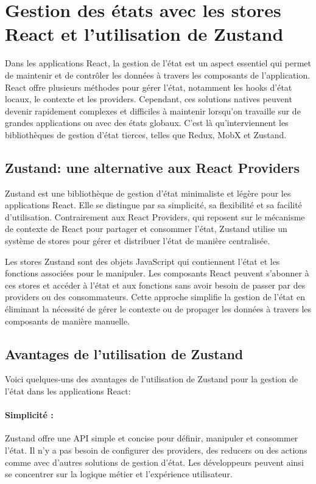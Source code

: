 \section{Gestion des états avec les stores React et l'utilisation de Zustand}

Dans les applications React, la gestion de l'état est un aspect essentiel qui permet de maintenir et de contrôler les données à travers les composants de l'application. React offre plusieurs méthodes pour gérer l'état, notamment les hooks d'état locaux, le contexte et les providers. Cependant, ces solutions natives peuvent devenir rapidement complexes et difficiles à maintenir lorsqu'on travaille sur de grandes applications ou avec des états globaux. C'est là qu'interviennent les bibliothèques de gestion d'état tierces, telles que Redux, MobX et Zustand.

\subsection{Zustand: une alternative aux React Providers}

Zustand est une bibliothèque de gestion d'état minimaliste et légère pour les applications React. Elle se distingue par sa simplicité, sa flexibilité et sa facilité d'utilisation. Contrairement aux React Providers, qui reposent sur le mécanisme de contexte de React pour partager et consommer l'état, Zustand utilise un système de stores pour gérer et distribuer l'état de manière centralisée.

Les stores Zustand sont des objets JavaScript qui contiennent l'état et les fonctions associées pour le manipuler. Les composants React peuvent s'abonner à ces stores et accéder à l'état et aux fonctions sans avoir besoin de passer par des providers ou des consommateurs. Cette approche simplifie la gestion de l'état en éliminant la nécessité de gérer le contexte ou de propager les données à travers les composants de manière manuelle.

\subsection{Avantages de l'utilisation de Zustand}

Voici quelques-uns des avantages de l'utilisation de Zustand pour la gestion de l'état dans les applications React:

\paragraph{Simplicité :} Zustand offre une API simple et concise pour définir, manipuler et consommer l'état. Il n'y a pas besoin de configurer des providers, des reducers ou des actions comme avec d'autres solutions de gestion d'état. Les développeurs peuvent ainsi se concentrer sur la logique métier et l'expérience utilisateur.

